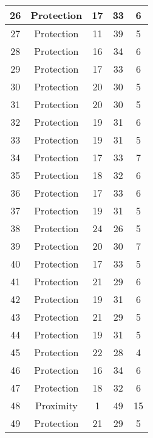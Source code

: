 \documentclass[results.tex]{subfiles}
\begin{document}
\begin{center}
\begin{tabular}{| c || c | c | c | c |}
    \hline
    26 & Protection & 17 & 33 & 6 \\ 
    \hline
    27 & Protection & 11 & 39 & 5 \\ 
    \hline
    28 & Protection & 16 & 34 & 6 \\ 
    \hline
    29 & Protection & 17 & 33 & 6 \\ 
    \hline
    30 & Protection & 20 & 30 & 5 \\ 
    \hline
    31 & Protection & 20 & 30 & 5 \\ 
    \hline
    32 & Protection & 19 & 31 & 6 \\ 
    \hline
    33 & Protection & 19 & 31 & 5 \\ 
    \hline
    34 & Protection & 17 & 33 & 7 \\ 
    \hline
    35 & Protection & 18 & 32 & 6 \\ 
    \hline
    36 & Protection & 17 & 33 & 6 \\ 
    \hline
    37 & Protection & 19 & 31 & 5 \\ 
    \hline
    38 & Protection & 24 & 26 & 5 \\ 
    \hline
    39 & Protection & 20 & 30 & 7 \\ 
    \hline
    40 & Protection & 17 & 33 & 5 \\ 
    \hline
    41 & Protection & 21 & 29 & 6 \\ 
    \hline
    42 & Protection & 19 & 31 & 6 \\ 
    \hline
    43 & Protection & 21 & 29 & 5 \\ 
    \hline
    44 & Protection & 19 & 31 & 5 \\ 
    \hline
    45 & Protection & 22 & 28 & 4 \\ 
    \hline
    46 & Protection & 16 & 34 & 6 \\ 
    \hline
    47 & Protection & 18 & 32 & 6 \\ 
    \hline
    48 & Proximity & 1 & 49 & 15 \\ 
    \hline
    49 & Protection & 21 & 29 & 5 \\ 
    \hline   \end{tabular}
\end{center}
\end{document}
